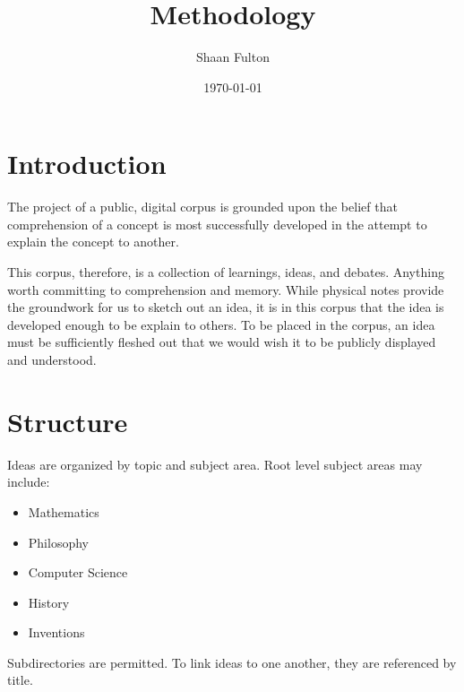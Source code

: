 \documentclass[12pt]{article}
\title{Methodology}
\author{Shaan Fulton}
\date{\today}
\begin{document}
\maketitle

\section*{Introduction}

The project of a public, digital corpus is grounded upon the belief that comprehension of a concept is most successfully developed in the attempt to explain the concept to another.

This corpus, therefore, is a collection of learnings, ideas, and debates. Anything worth committing to comprehension and memory. While physical notes provide the groundwork for us to sketch out an idea, it is in this corpus that the idea is developed enough to be explain to others. To be placed in the corpus, an idea must be sufficiently fleshed out that we would wish it to be publicly displayed and understood.

\section*{Structure}

Ideas are organized by topic and subject area. Root level subject areas may include:

\begin{itemize}
\item Mathematics
\item Philosophy
\item Computer Science
\item History
\item Inventions
\end{itemize}

Subdirectories are permitted. To link ideas to one another, they are referenced by title.
\end{document}
